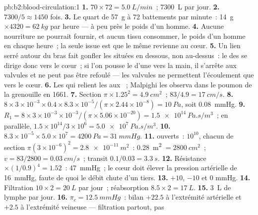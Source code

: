 \begin{solution}{pb:b2:blood-circulation:1}
\textbf{1.} $70\times 72 = \qty{5.0}{L/min}$~; \qty{7300}{L} par jour.
\textbf{2.} $7300/5 \approx 1450$ fois.
\textbf{3.} Le quart de \qty{57}{g} à 72 battements par minute~:
\qty{14}{g}
$\times 4320 = \qty{62}{kg}$ par heure --- à peu près le poids d'un homme.
\textbf{4.} Aucune nourriture ne pourrait fournir, et aucun tissu
consommer, le poids d'un homme en  chaque heure~; la seule issue est
que le même  revienne au cœur.
\textbf{5.} Un lien serré autour du bras fait gonfler les  situées
en dessous, non au-dessus~: le  des  se dirige donc vers le
cœur~; si l'on pousse le  d'une  vers la main, il s'arrête aux
valvules et ne peut pas être refoulé --- les valvules ne permettent
l'écoulement que vers le cœur.
\textbf{6.} Les  qui relient les  aux ~;
Malpighi les observa dans le poumon de la grenouille en 1661.
\textbf{7.} Section $\pi\times 1.25^{2} = \qty{4.9}{cm^2}$~; $83/4.9 =
\qty{17}{cm/s}$.
\textbf{8.} $8\times 3\times 10^{-3}\times 0.4\times 8.3\times
10^{-5}/(\pi\times 2.44\times 10^{-8}) = \qty{10}{Pa}$, soit
\qty{0.08}{mmHg}.
\textbf{9.} $R_{1} = 8\times 3\times 10^{-3}\times 10^{-3}/(\pi\times
5.06\times 10^{-20}) = \qty{1.5e14}{Pa.s/m^3}$~; en parallèle,
$1.5\times 10^{14}/3\times 10^{6} = \qty{5.0e7}{Pa.s/m^3}$.
\textbf{10.} $8.3\times 10^{-5}\times 5.0\times 10^{7} = \qty{4200}{Pa}
= \qty{31}{mmHg}$.
\textbf{11.}  ouverts~: $10^{10}$, chacun de section
$\pi(3\times 10^{-6})^{2}
= \qty{2.8e-11}{m^2}$~: \qty{0.28}{m^2} $= \qty{2800}{cm^2}$~; $v =
83/2800 = \qty{0.03}{cm/s}$~; transit $0.1/0.03 = \qty{3.3}{s}$.
\textbf{12.} Résistance $\times(1/0.9)^{4} = 1.52$~: \qty{47}{mmHg}~; le
cœur doit élever la pression artérielle de \qty{16}{mmHg}, faute de quoi
le débit chute d'un tiers.
\textbf{13.} $+10$, $-10$ et $0$ mmHg.
\textbf{14.} Filtration $10\times 2 = \qty{20}{L}$ par jour~;
réabsorption $8.5\times 2 = \qty{17}{L}$.
\textbf{15.} \qty{3}{L} de lymphe par jour.
\textbf{16.} $\pi_c = \qty{12.5}{mmHg}$~: bilan $+22.5$ à l'extrémité
artérielle et $+2.5$ à l'extrémité veineuse --- filtration partout, pas

\end{solution}
